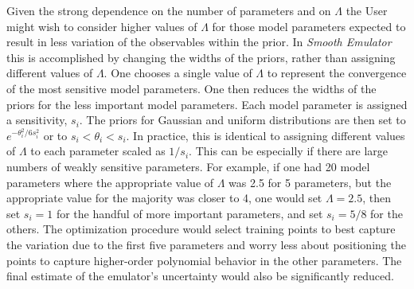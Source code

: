\documentclass[UserManual.tex]{subfiles}
\begin{document}
Given the strong dependence on the number of parameters and on $\Lambda$ the User might wish to consider higher values of $\Lambda$ for those model parameters expected to result in less variation of the observables within the prior. In {\it Smooth Emulator} this is accomplished by changing the widths of the priors, rather than assigning different values of $\Lambda$. One chooses a single value of $\Lambda$ to represent the convergence of the most sensitive model parameters. One then reduces the widths of the priors for the less important model parameters. Each model parameter is assigned a sensitivity, $s_i$. The priors for Gaussian and uniform distributions are then set to $e^{-\theta_i^2/6s_i^2}$ or to $s_i<\theta_i<s_i$. In practice, this is identical to assigning different values of $\Lambda$ to each parameter scaled as $1/s_i$. This can be especially if there are large numbers of weakly sensitive parameters. For example, if one had 20 model parameters where the appropriate value of $\Lambda$ was 2.5 for 5 parameters, but the appropriate value for the majority was closer to 4, one would set $\Lambda=2.5$, then set $s_i=1$ for the handful of more important parameters, and set $s_i=5/8$ for the others. The optimization procedure would select training points to best capture the variation due to the first five parameters and worry less about positioning the points to capture higher-order polynomial behavior in the other parameters. The final estimate of the emulator's uncertainty would also be significantly reduced.
\end{document}
